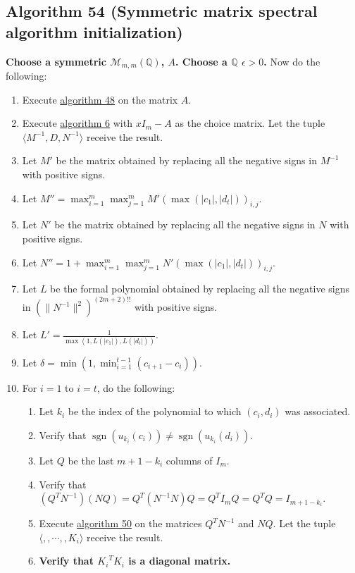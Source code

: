 \documentclass[twocolumn]{article}
\DeclareMathOperator{\sgn}{sgn}
\begin{document}
		\subsection{Algorithm 54 (Symmetric matrix spectral algorithm initialization)}\label{sec:algorithm 54}
			\textbf{Choose a symmetric $\mathcal{M}_{m,m}(\mathbb{Q})$, $A$. Choose a $\mathbb{Q}$ $\epsilon>0$.} Now do the following:
			\begin{enumerate}
				\item Execute \hyperref[sec:algorithm 48]{algorithm 48} on the matrix $A$.
				\item Execute \hyperref[sec:algorithm 6]{algorithm 6} with $xI_m-A$ as the choice matrix. Let the tuple $\langle M^{-1},D,N^{-1}\rangle$ receive the result.
				\item Let $M'$ be the matrix obtained by replacing all the negative signs in $M^{-1}$ with positive signs.
				\item Let $M''=\max_{i=1}^m\max_{j=1}^mM'(\max(\lvert c_1\rvert,\lvert d_t\rvert))_{i,j}$.
				\item Let $N'$ be the matrix obtained by replacing all the negative signs in $N$ with positive signs.
				\item Let $N''=1+\max_{i=1}^m\max_{j=1}^mN'(\max(\lvert c_1\rvert,\lvert d_t\rvert))_{i,j}$.
				\item Let $L$ be the formal polynomial obtained by replacing all the negative signs in $(\lVert N^{-1}\rVert^2)^{(2m+2)!!}$ with positive signs.
				\item Let $L'=\frac{1}{\max(1,L(\lvert c_1\rvert),L(\lvert d_t\rvert))}$.
				\item Let $\delta=\min(1,\min_{i=1}^{t-1}(c_{i+1}-c_i))$.
				\item For $i=1$ to $i=t$, do the following:
				\begin{enumerate}
					\item Let $k_i$ be the index of the polynomial to which $(c_i, d_i)$ was associated.
					\item Verify that $\sgn(u_{k_i}(c_i))\ne\sgn(u_{k_i}(d_i))$.
					\item Let $Q$ be the last $m+1-k_i$ columns of $I_m$.
					\item Verify that $(Q^TN^{-1})(NQ)=Q^T(N^{-1}N)Q=Q^TI_mQ=Q^TQ=I_{m+1-k_i}$.
					\item Execute \hyperref[sec:algorithm 50]{algorithm 50} on the matrices $Q^TN^{-1}$ and $NQ$. Let the tuple $\langle ,,\cdots,,K_i\rangle$ receive the result.
					\item \textbf{Verify that ${K_i}^T{K_i}$ is a diagonal matrix.}

\end{enumerate}
\end{enumerate}
\end{document}
